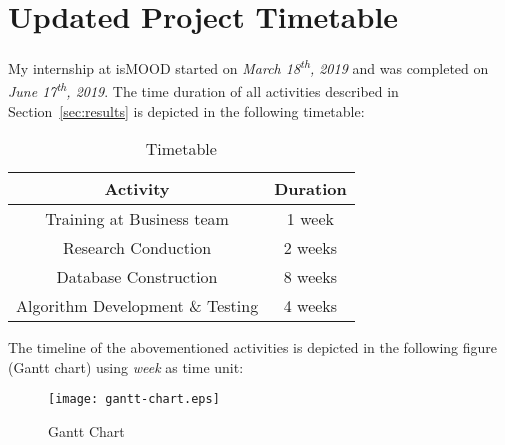 \section{Updated Project Timetable}
\label{sec:timetable}

My internship at isMOOD started
on \emph{March 18\textsuperscript{th}, 2019}
and was completed 
on \emph{June 17\textsuperscript{th}, 2019}.
The time duration of all activities
described in Section~\ref{sec:results}
is depicted in the following timetable:

\begin{table}[ht]
\centering
\begin{tabular}{ |c|c| }
 \hline
 \textbf{Activity} & \textbf{Duration} \\ 
 \hline
 Training at Business team & 1 week \\
 \hline
 Research Conduction & 2 weeks \\ 
 \hline
 Database Construction & 8 weeks \\ 
 \hline
 Algorithm Development \& Testing & 4 weeks \\
 \hline
\end{tabular}
\caption{Timetable}
\label{tab:timetable}
\end{table}

The timeline of the abovementioned activities
is depicted in the following figure (Gantt chart)
using \emph{week} as time unit:

\begin{figure}[ht]
\centering
\texttt{[image: gantt-chart.eps]}
\caption{Gantt Chart}
\label{fig:gantt-chart}
\end{figure}

% 


